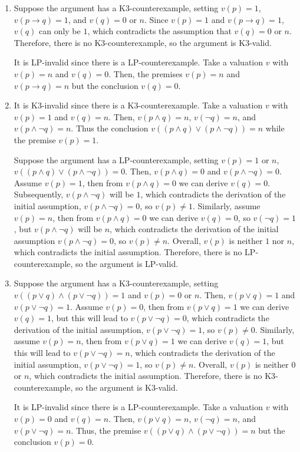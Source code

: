 \begin{enumerate}[label=(\alph*)]
\item
Suppose the argument has a K3-counterexample, setting $v(p) = 1$, $v(p \to q) = 1$, and $v(q) = 0$ or $n$. Since $v(p) = 1$ and $v(p \to q) = 1$, $v(q)$ can only be $1$, which contradicts the assumption that $v(q) = 0$ or $n$. Therefore, there is no K3-counterexample, so the argument is K3-valid.

It is LP-invalid since there is a LP-counterexample. Take a valuation $v$ with $v(p) = n$ and $v(q) = 0$. Then, the premises $v(p) = n$ and $v(p \to q) = n$ but the conclusion $v(q) = 0$.

\item
It is K3-invalid since there is a K3-counterexample. Take a valuation $v$ with $v(p) = 1$ and $v(q) = n$. Then, $v(p \land q) = n$, $v(\neg q) = n$, and $v(p \land \neg q) = n$. Thus the conclusion $v( (p \land q) \lor (p \land \neg q) ) = n$ while the premise $v(p) = 1$.

Suppose the argument has a LP-counterexample, setting $v(p) = 1$ or $n$, $v( (p \land q) \lor (p \land \neg q) ) = 0$. Then, $v(p \land q) = 0$ and $v(p \land \neg q) = 0$. Assume $v(p) = 1$, then from $v(p \land q) = 0$ we can derive $v(q) = 0$. Subsequently, $v(p \land \neg q)$ will be $1$, which contradicts the derivation of the initial assumption, $v(p \land \neg q) = 0$, so $v(p) \not = 1$. Similarly, assume $v(p) = n$, then from $v(p \land q) = 0$ we can derive $v(q) = 0$, so $v(\neg q) = 1$, but $v(p \land \neg q)$ will be $n$, which contradicts the derivation of the initial assumption $v(p \land \neg q) = 0$, so $v(p) \not = n$. Overall, $v(p)$ is neither $1$ nor $n$, which contradicts the initial assumption. Therefore, there is no LP-counterexample, so the argument is LP-valid.

\item
Suppose the argument has a K3-counterexample, setting $v( (p \lor q) \land (p \lor \neg q) ) = 1$ and $v(p) = 0$ or $n$. Then, $v(p \lor q) = 1$ and $v(p \lor \neg q) = 1$. Assume $v(p) = 0$, then from $v(p \lor q) = 1$ we can derive $v(q) = 1$, but this will lead to $v(p \lor \neg q) = 0$, which contradicts the derivation of the initial assumption, $v(p \lor \neg q) = 1$, so $v(p) \not = 0$. Similarly, assume $v(p) = n$, then from $v(p \lor q) = 1$ we can derive $v(q) = 1$, but this will lead to $v(p \lor \neg q) = n$, which contradicts the derivation of the initial assumption, $v(p \lor \neg q) = 1$, so $v(p) \not = n$. Overall, $v(p)$ is neither $0$ or $n$, which contradicts the initial assumption. Therefore, there is no K3-counterexample, so the argument is K3-valid.

It is LP-invalid since there is a LP-counterexample. Take a valuation $v$ with $v(p) = 0$ and $v(q) = n$. Then, $v(p \lor q) = n$, $v(\neg q) = n$, and $v(p \lor \neg q) = n$. Thus, the premise $v( (p \lor q) \land (p \lor \neg q) ) = n$ but the conclusion $v(p) = 0$.

\end{enumerate}
